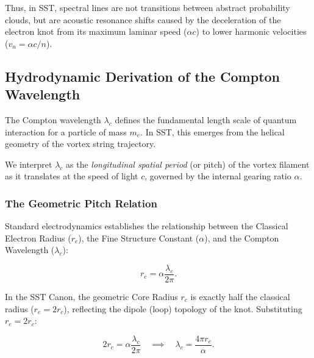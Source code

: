 \documentclass[10pt,reprint,aps,onecolumn,nofootinbib]{revtex4-2}
\begin{document}
            Thus, in SST, spectral lines are not transitions between abstract
            probability clouds, but are acoustic resonance shifts caused by the
            deceleration of the electron knot from its maximum laminar speed
            ($\alpha c$) to lower harmonic velocities ($v_n = \alpha c / n$).
    \subsection{Hydrodynamic Derivation of the Compton Wavelength}
        \label{sec:SST_compton}

        The Compton wavelength $\lambda_c$ defines the fundamental length scale of
        quantum interaction for a particle of mass $m_e$. In SST, this emerges
        from the helical geometry of the vortex string trajectory.

        We interpret $\lambda_c$ as the \emph{longitudinal spatial period} (or pitch)
        of the vortex filament as it translates at the speed of light $c$,
        governed by the internal gearing ratio $\alpha$.

        \subsubsection*{The Geometric Pitch Relation}

            Standard electrodynamics establishes the relationship between the
            Classical Electron Radius ($r_e$), the Fine Structure Constant ($\alpha$),
            and the Compton Wavelength ($\lambda_c$):

            \begin{equation}
                r_e = \alpha \frac{\lambda_c}{2\pi}.
            \end{equation}

            In the SST Canon, the geometric Core Radius $r_c$ is exactly half the
            classical radius ($r_e = 2r_c$), reflecting the dipole (loop) topology
            of the knot. Substituting $r_e = 2r_c$:

            \begin{equation}
                2r_c = \alpha \frac{\lambda_c}{2\pi} \quad \implies \quad
                \lambda_c = \frac{4\pi r_c}{\alpha}.
                \label{eq:lambda_geo}
            \end{equation}
\end{document}
